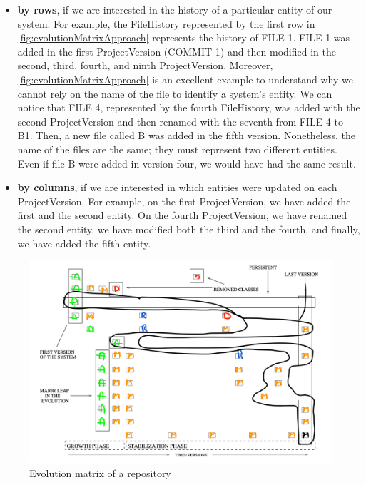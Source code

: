  \begin{itemize}
     \item \textbf{by rows}, if we are interested in the history of a particular entity of our system. 
     For example, the FileHistory represented by the first row in \autoref{fig:evolutionMatrixApproach} represents the history of FILE 1. 
     FILE 1 was added in the first ProjectVersion (COMMIT 1) and then modified in the second, third, fourth, and ninth ProjectVersion.
     Moreover, \autoref{fig:evolutionMatrixApproach} is an excellent example to understand why we cannot rely on the name of the file to identify a system's entity. 
     We can notice that FILE 4, represented by the fourth FileHistory, was added with the second ProjectVersion and then renamed with the seventh from FILE 4 to B1. 
     Then, a new file called B was added in the fifth version. Nonetheless, the name of the files are the same; they must represent two different entities. 
     Even if file B were added in version four, we would have had the same result. 
     \item \textbf{by columns}, if we are interested in which entities were updated on each ProjectVersion. 
    For example, on the first ProjectVersion, we have added the first and the second entity. 
    On the fourth ProjectVersion, we have renamed the second entity, we have modified both the third and the fourth, and finally, we have added the fifth entity.
 \end{itemize}

\begin{figure}
    \center
    \includegraphics[width=\textwidth]{ApproachMatrix2.png}
    \caption{Evolution matrix of a repository}
    \label{fig:evolutionMatrixApproach2}
\end{figure}

